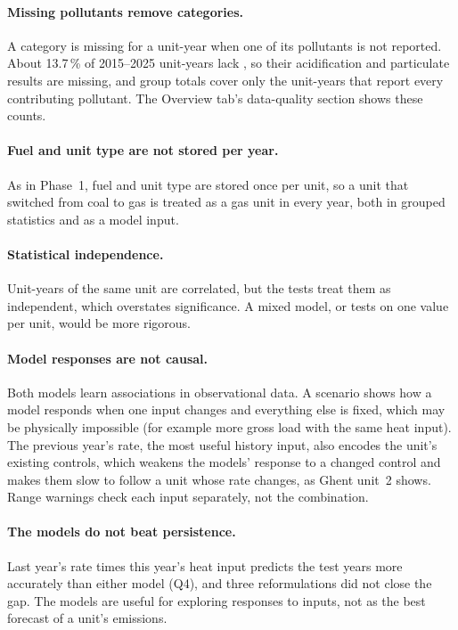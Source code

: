 \documentclass[11pt,a4paper]{article}
\begin{document}
\paragraph{Missing pollutants remove categories.} A category is missing for a unit-year when one
of its pollutants is not reported. About 13.7\,\% of 2015--2025 unit-years lack \SOtwo{}, so
their acidification and particulate results are missing, and group totals cover only the
unit-years that report every contributing pollutant. The Overview tab's data-quality section shows these counts.

\paragraph{Fuel and unit type are not stored per year.} As in Phase~1, fuel and unit type are
stored once per unit, so a unit that switched from coal to gas is treated as a gas unit in every
year, both in grouped statistics and as a model input.

\paragraph{Statistical independence.} Unit-years of the same unit are correlated, but the tests
treat them as independent, which overstates significance. A mixed model, or tests on one value
per unit, would be more rigorous.

\paragraph{Model responses are not causal.} Both models learn associations in observational data.
A scenario shows how a model responds when one input changes and everything else is fixed, which
may be physically impossible (for example more gross load with the same heat input). The
previous year's \NOx{} rate, the most useful history input, also encodes the unit's existing
controls, which weakens the models' response to a changed control and makes them slow to follow
a unit whose rate changes, as Ghent unit~2 shows. Range warnings check each input separately,
not the combination.

\paragraph{The models do not beat persistence.} Last year's \NOx{} rate times this year's heat
input predicts the test years more accurately than either model (Q4), and three reformulations
did not close the gap. The models are useful for exploring responses to inputs, not as the best
forecast of a unit's emissions.
\end{document}
